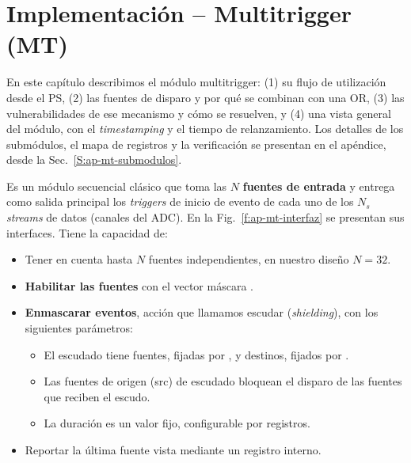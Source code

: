 \chapter{Implementación -- Multitrigger (MT)}
\label{C:multitrigger}

\graphicspath{{figs/cap3/}{figs/comunes/}}

\begin{destacado}
En este capítulo describimos el módulo multitrigger: (1) su flujo de utilización
desde el PS, (2) las fuentes de disparo y por qué se combinan con una OR, (3)
las vulnerabilidades de ese mecanismo y cómo se resuelven, y (4) una vista
general del módulo, con el \emph{timestamping} y el tiempo de relanzamiento. Los
detalles de los submódulos, el mapa de registros y la verificación se presentan
en el apéndice, desde la Sec.~\ref{S:ap-mt-submodulos}.
\end{destacado}

Es un módulo secuencial clásico que toma las $N$ \textbf{fuentes de entrada} y
entrega como salida principal los \emph{triggers} de inicio de evento de cada
uno de los $N_s$ \emph{streams} de datos (canales del ADC). En la
Fig.~\ref{f:ap-mt-interfaz} se presentan sus interfaces. Tiene la capacidad
de:
\begin{itemize}
  \item Tener en cuenta hasta $N$ fuentes independientes, en nuestro diseño
    $N=32$.
  \item \textbf{Habilitar las fuentes} con el vector máscara .
  \item \textbf{Enmascarar eventos}, acción que llamamos escudar
    (\emph{shielding}), con los siguientes parámetros:
  \begin{itemize}
    \item El escudado tiene fuentes, fijadas por , y
      destinos, fijados por .
    \item Las fuentes de origen (src) de escudado bloquean el disparo de las
      fuentes que reciben el escudo.
    \item La duración es un valor fijo, configurable por registros.
  \end{itemize}
  \item Reportar la última fuente vista mediante un registro interno.
\end{itemize}

